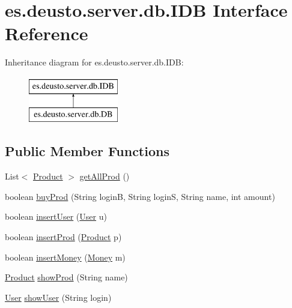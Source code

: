\hypertarget{interfacees_1_1deusto_1_1server_1_1db_1_1_i_d_b}{}\section{es.\+deusto.\+server.\+db.\+I\+DB Interface Reference}
\label{interfacees_1_1deusto_1_1server_1_1db_1_1_i_d_b}
Inheritance diagram for es.\+deusto.\+server.\+db.\+I\+DB\+:\begin{figure}[H]
\begin{center}
\leavevmode
\includegraphics[height=2.000000cm]{interfacees_1_1deusto_1_1server_1_1db_1_1_i_d_b}
\end{center}
\end{figure}
\subsection*{Public Member Functions}
\begin{DoxyCompactItemize}
\item 
List$<$ \hyperlink{classes_1_1deusto_1_1server_1_1db_1_1data_1_1_product}{Product} $>$ \hyperlink{interfacees_1_1deusto_1_1server_1_1db_1_1_i_d_b_aba694290fde102c2eed31e505dd257fb}{get\+All\+Prod} ()
\item 
boolean \hyperlink{interfacees_1_1deusto_1_1server_1_1db_1_1_i_d_b_a64b43ced1334b833f7ee557badd2c5b7}{buy\+Prod} (String loginB, String loginS, String name, int amount)
\item 
boolean \hyperlink{interfacees_1_1deusto_1_1server_1_1db_1_1_i_d_b_a9d76b65686526214b48cd7d8f8dcdc86}{insert\+User} (\hyperlink{classes_1_1deusto_1_1server_1_1db_1_1data_1_1_user}{User} u)
\item 
boolean \hyperlink{interfacees_1_1deusto_1_1server_1_1db_1_1_i_d_b_a4c9c0a9511fde5b541a49de8f8399d28}{insert\+Prod} (\hyperlink{classes_1_1deusto_1_1server_1_1db_1_1data_1_1_product}{Product} p)
\item 
boolean \hyperlink{interfacees_1_1deusto_1_1server_1_1db_1_1_i_d_b_afcce296d82fa0a6fb8083215b3647663}{insert\+Money} (\hyperlink{classes_1_1deusto_1_1server_1_1db_1_1data_1_1_money}{Money} m)
\item 
\hyperlink{classes_1_1deusto_1_1server_1_1db_1_1data_1_1_product}{Product} \hyperlink{interfacees_1_1deusto_1_1server_1_1db_1_1_i_d_b_a8a4f72bb5148aff5b6f82679a7650b29}{show\+Prod} (String name)
\item 
\hyperlink{classes_1_1deusto_1_1server_1_1db_1_1data_1_1_user}{User} \hyperlink{interfacees_1_1deusto_1_1server_1_1db_1_1_i_d_b_aa2f6a5291fa8aa78d5a73b5878d17986}{show\+User} (String login)
\end{DoxyCompactItemize}


